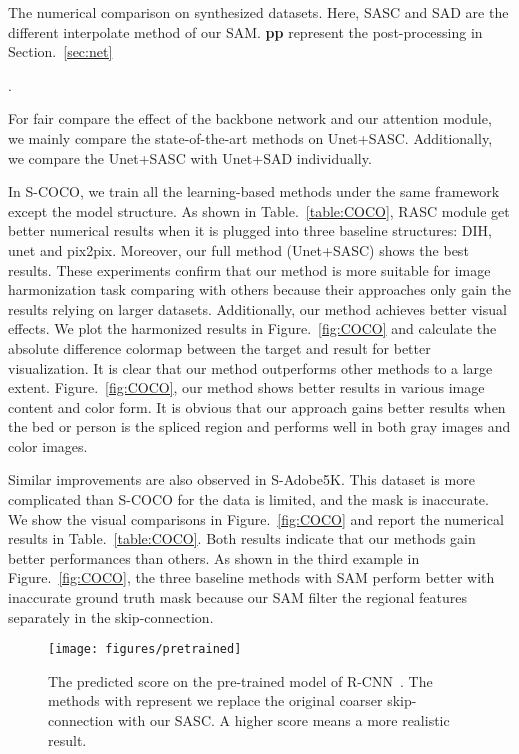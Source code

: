 \begin{table}[t!]
\caption{The numerical comparison on synthesized datasets. Here, SASC and SAD are the different interpolate method of our SAM. \textbf{pp} represent the post-processing in Section.~\ref{sec:net}}.

\label{table:COCO}
\end{table} For fair compare the effect of the backbone network and our attention module, we mainly compare the state-of-the-art methods on Unet+SASC. Additionally, we compare the Unet+SASC with Unet+SAD individually.

In S-COCO, we train all the learning-based methods under the same framework except the model structure. As shown in Table.~\ref{table:COCO}, RASC module get better numerical results when it is plugged into three baseline structures: DIH, unet and pix2pix. Moreover, our full method (Unet+SASC) shows the best results. These experiments confirm that our method is more suitable for image harmonization task comparing with others because their approaches only gain the results relying on larger datasets. Additionally, our method achieves better visual effects. We plot the harmonized results in Figure.~\ref{fig:COCO} and calculate the absolute difference colormap between the target and result for better visualization. It is clear that our method outperforms other methods to a large extent. 
Figure.~\ref{fig:COCO}, our method shows better results in various image content and color form. It is obvious that our approach gains better results when the bed or person is the spliced region and performs well in both gray images and color images.


Similar improvements are also observed in S-Adobe5K. This dataset is more complicated than S-COCO for the data is limited, and the mask is inaccurate.
We show the visual comparisons in Figure.~\ref{fig:COCO} and report the numerical results in Table.~\ref{table:COCO}. Both results indicate that our methods gain better performances than others. As shown in the third example in Figure.~\ref{fig:COCO}, the three baseline methods with SAM perform better with inaccurate ground truth mask because our SAM filter the regional features separately in the skip-connection. 

\begin{figure}[t]
\centering
  \texttt{[image: figures/pretrained]}
  \caption{The predicted score on the pre-trained model of R-CNN~\cite{Zhu:2015tl}. The methods with  represent we replace the original coarser skip-connection with our SASC. A higher score means a more realistic result.}
  \label{figure:pretrained}
  \vspace{-1.5em}
\end{figure}

